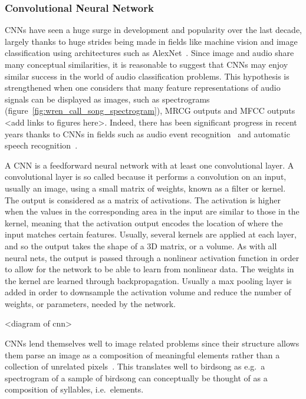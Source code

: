 \subsubsection{Convolutional Neural Network}

CNNs have seen a huge surge in development and popularity over the last decade,
largely thanks to huge strides being made in fields like machine vision and
image classification using architectures such as
AlexNet~\cite{krizhevsky2012imagenet}. Since image and audio share many
conceptual similarities, it is reasonable to suggest that CNNs may enjoy similar
success in the world of audio classification problems. This hypothesis is
strengthened when one considers that many feature representations of audio
signals can be displayed as images, such as spectrograms
(figure~\ref{fig:wren_call_song_spectrogram}), MRCG outputs and MFCC outputs
<add links to figures here>. Indeed, there has been significant progress in
recent years thanks to CNNs in fields such as audio event
recognition~\cite{takahashi2017aenet} and automatic speech
recognition~\cite{sercu2016very}.

A CNN is a feedforward neural network with at least one convolutional layer. A
convolutional layer is so called because it performs a convolution on an input,
usually an image, using a small matrix of weights, known as a filter or kernel.
The output is considered as a matrix of activations. The activation is higher
when the values in the corresponding area in the input are similar to those in
the kernel, meaning that the activation output encodes the location of where the
input matches certain features. Usually, several kernels are applied at each
layer, and so the output takes the shape of a 3D matrix, or a volume. As with
all neural nets, the output is passed through a nonlinear activation function in
order to allow for the network to be able to learn from nonlinear data. The
weights in the kernel are learned through backpropagation. Usually a max
pooling layer is added in order to downsample the activation volume and reduce
the number of weights, or parameters, needed by the network.

<diagram of cnn>

CNNs lend themselves well to image related problems since their structure
allows them parse an image as a composition of meaningful elements rather than a
collection of unrelated pixels~\cite{lecun2015deep}. This translates well to
birdsong as e.g.\ a spectrogram of a sample of birdsong can conceptually be
thought of as a composition of syllables, i.e.\ elements.

